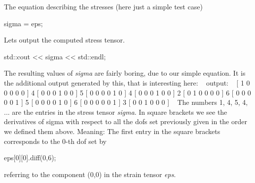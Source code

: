  The equation describing the stresses (here just a simple test case) 
\begin{DoxyCode}
sigma = eps;
\end{DoxyCode}
 Let\textquotesingle{}s output the computed stress tensor. 
\begin{DoxyCode}
std::cout << sigma << std::endl;
\end{DoxyCode}
 The resulting values of {\itshape sigma} are fairly boring, due to our simple equation. It is the additional output generated by this, that is interesting here\+: ~\newline
output\+: ~ \mbox{[} 1 0 0 0 0 0 \mbox{]} 4 \mbox{[} 0 0 0 1 0 0 \mbox{]} 5 \mbox{[} 0 0 0 0 1 0 \mbox{]} 4 \mbox{[} 0 0 0 1 0 0 \mbox{]} 2 \mbox{[} 0 1 0 0 0 0 \mbox{]} 6 \mbox{[} 0 0 0 0 0 1 \mbox{]} 5 \mbox{[} 0 0 0 0 1 0 \mbox{]} 6 \mbox{[} 0 0 0 0 0 1 \mbox{]} 3 \mbox{[} 0 0 1 0 0 0 \mbox{]} ~\newline
The numbers 1, 4, 5, 4, ... are the entries in the stress tensor {\itshape sigma}. In square brackets we see the derivatives of sigma with respect to all the dofs set previously given in the order we defined them above. Meaning\+: The first entry in the square brackets corresponds to the 0-\/th dof set by 
\begin{DoxyCode}
eps[0][0].diff(0,6); 
\end{DoxyCode}
 referring to the component (0,0) in the strain tensor {\itshape eps}.

